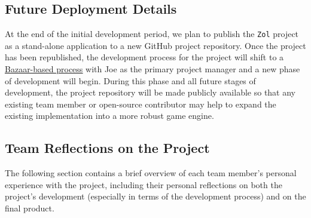 \documentclass{article}
\newcommand{\projectname}[0] {\texttt{Zol} }
\begin{document}
		\subsection[Deployment]{Future Deployment Details}
		At the end of the initial development period, we plan to publish
		the \projectname project as a stand-alone application to a new
		GitHub project repository.  Once the project has been republished,
		the development process for the project will shift to a
		\href{http://en.wikipedia.org/wiki/The\_Cathedral\_and\_the\_Bazaar}
        {{\color{blue}\underline{Bazaar-based process}}} with Joe as the primary project manager
		and a new phase of development will begin.  During this phase and all
		future stages of development, the project repository will be made publicly
		available so that any existing team member or open-source contributor
		may help to expand the existing implementation into a more robust
		game engine.

		\subsection[Personal Reflections]{Team Reflections on the Project}
		The following section contains a brief overview of each team member's
		personal experience with the project, including their personal reflections
		on both the project's development (especially in terms of the development
		process) and on the final product.
\end{document}
